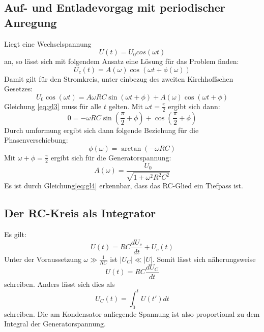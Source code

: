 \subsection{Auf- und Entladevorgag mit periodischer Anregung}
Liegt eine Wechselspannung
\begin{equation}
  U(t)=U_0 cos(\omega t)
\end{equation}
an, so lässt sich mit folgendem Ansatz eine Lösung für das Problem finden:
\begin{equation}
  U_c(t)= A(\omega) \cos{(\omega t + \phi(\omega))}
\end{equation}
Damit gilt für den Stromkreis, unter einbezug des zweiten Kirchhoffschen Gesetzes:
\begin{equation}
  \label{eq:gl3}
  U_0 \cos{(\omega t)} = A \omega R C \sin{(\omega t + \phi)} + A(\omega)\cos{(\omega t + \phi)}
\end{equation}
Gleichung \eqref{eq:gl3} muss für alle $t$ gelten. Mit $\omega t= \frac{\pi}{2}$ ergibt sich dann:
\begin{equation}
  0 = - \omega R C \sin{(\frac{\pi}{2}+\phi)} + \cos{(\frac{\pi}{2}+\phi)}
\end{equation}
Durch umformung ergibt sich dann folgende Beziehung für die Phasenverschiebung:
\begin{equation}
  \phi(\omega)=\arctan{(- \omega R C)}
\end{equation}
Mit $\omega +\phi =\frac{\pi}{2}$ ergibt sich für die Generatorspannung:
\begin{equation}
  \label{eq:gl4}
  A(\omega)= \frac{U_0}{\sqrt{1+\omega^2 R^2 C^2}}
\end{equation}
Es ist durch Gleichung\eqref{eq:gl4} erkennbar, dass das RC-Glied ein Tiefpass ist.

\subsection{Der RC-Kreis als Integrator}
Es gilt:
\begin{equation}
  U(t)= RC \frac{dU_c}{dt} + U_c(t)
\end{equation}
Unter der Voraussetzung $\omega \gg\frac{1}{RC}$ ist $|U_C| \ll|U|$.
Somit lässt sich näherungsweise
\begin{equation}
  U(t)=RC \frac{dU_C}{dt}
\end{equation}
schreiben.
Anders lässt sich dies als
\begin{equation}
  U_C(t)=\int_0^t U(t') dt
\end{equation}
schreiben.
Die am Kondensator anliegende Spannung ist also proportional zu dem Integral der Generatorspannung.
